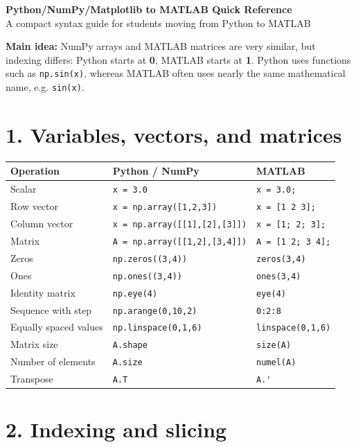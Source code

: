 \documentclass[9pt]{extarticle}
\newcommand{\py}[1]{\lstinline[style=code]!#1!}
\newcommand{\matlab}[1]{\lstinline[style=code]!#1!}
\begin{document}
\begin{center}
{\LARGE \textbf{Python/NumPy/Matplotlib to MATLAB Quick Reference}}\\[3pt]
{\small A compact syntax guide for students moving from Python to MATLAB}
\end{center}

\vspace{-4pt}
\textbf{Main idea:} NumPy arrays and MATLAB matrices are very similar, but indexing differs: Python starts at \textbf{0}, MATLAB starts at \textbf{1}. Python uses functions such as \py{np.sin(x)}, whereas MATLAB often uses nearly the same mathematical name, e.g. \matlab{sin(x)}.

\section*{1. Variables, vectors, and matrices}

\begin{tabularx}{\textwidth}{>{\raggedright\arraybackslash}p{} X X}
\toprule
\textbf{Operation} & \textbf{Python / NumPy} & \textbf{MATLAB} \\
\midrule
Scalar & \py{x = 3.0} & \matlab{x = 3.0;} \\
Row vector & \py{x = np.array([1,2,3])} & \matlab{x = [1 2 3];} \\
Column vector & \py{x = np.array([[1],[2],[3]])} & \matlab{x = [1; 2; 3];} \\
Matrix & \py{A = np.array([[1,2],[3,4]])} & \matlab{A = [1 2; 3 4];} \\
Zeros & \py{np.zeros((3,4))} & \matlab{zeros(3,4)} \\
Ones & \py{np.ones((3,4))} & \matlab{ones(3,4)} \\
Identity matrix & \py{np.eye(4)} & \matlab{eye(4)} \\
Sequence with step & \py{np.arange(0,10,2)} & \matlab{0:2:8} \\
Equally spaced values & \py{np.linspace(0,1,6)} & \matlab{linspace(0,1,6)} \\
Matrix size & \py{A.shape} & \matlab{size(A)} \\
Number of elements & \py{A.size} & \matlab{numel(A)} \\
Transpose & \py{A.T} & \matlab{A.'} \\
\bottomrule
\end{tabularx}

\section*{2. Indexing and slicing}
\end{document}
